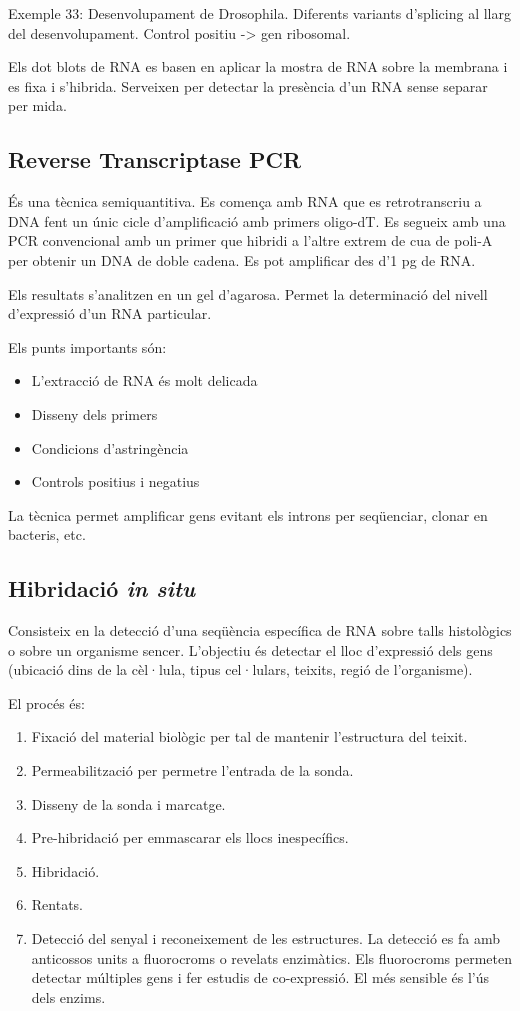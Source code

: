 Exemple 33: Desenvolupament de Drosophila. Diferents variants
d'splicing al llarg del desenvolupament. Control positiu -> gen
ribosomal.

Els dot blots de RNA es basen en aplicar la mostra de RNA sobre la
membrana i es fixa i s'hibrida. Serveixen per detectar la presència
d'un RNA sense separar per mida.

\subsection{Reverse Transcriptase PCR}
\label{sec:reverse-transcr-pcr}
És una tècnica semiquantitiva. Es comença amb RNA que es retrotranscriu a
DNA fent un únic cicle d'amplificació amb primers oligo-dT. Es
segueix amb una PCR convencional amb un primer que hibridi a l'altre
extrem de cua de poli-A per obtenir un DNA de doble cadena. Es pot
amplificar des d'1 pg de RNA.

Els resultats s'analitzen en un gel d'agarosa. Permet la determinació
del nivell d'expressió d'un RNA particular.

Els punts importants són:
\begin{itemize}
\item L'extracció de RNA és molt delicada
\item Disseny dels primers
\item Condicions d'astringència
\item Controls positius i negatius
\end{itemize}

La tècnica permet amplificar gens evitant els introns per seqüenciar,
clonar en bacteris, etc.

\subsection{Hibridació \textit{in situ}}
\label{sec:hibridacio-situ}
Consisteix en la detecció d'una seqüència específica de RNA sobre
talls histològics o sobre un organisme sencer. L'objectiu és detectar
el lloc d'expressió dels gens (ubicació dins de la cèl·lula, tipus
cel·lulars, teixits, regió de l'organisme).

El procés és:
\begin{enumerate}
\item Fixació del material biològic per tal de mantenir l'estructura
  del teixit.
\item Permeabilització per permetre l'entrada de la sonda.
\item Disseny de la sonda i marcatge.
\item Pre-hibridació per emmascarar els llocs inespecífics.
\item Hibridació.
\item Rentats.
\item Detecció del senyal i reconeixement de les estructures. La
  detecció es fa amb anticossos units a fluorocroms o revelats
  enzimàtics. Els fluorocroms permeten detectar múltiples gens i fer
  estudis de co-expressió. El més sensible és l'ús dels enzims.
\end{enumerate}


